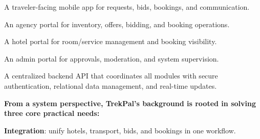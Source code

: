 \documentclass[12pt,a4paper]{article}
\newlength{\ThesisParagraphIndent}
\newcommand{\ThesisParagraph}[1]{%
  \par\begingroup
  \setlength{\leftskip}{\ThesisParagraphIndent}%
  \setlength{\parindent}{0pt}%
  \noindent#1\par
  \endgroup}
\begin{document}
\begin{list}{}{\setlength{\leftmargin}{\dimexpr\ThesisParagraphIndent+1.5em\relax}\setlength{\labelsep}{0.5em}\setlength{\topsep}{2pt}\setlength{\parsep}{0pt}}
\item[\textbullet] A traveler-facing mobile app for requests, bids, bookings, and communication.
\end{list}


\begin{list}{}{\setlength{\leftmargin}{\dimexpr\ThesisParagraphIndent+1.5em\relax}\setlength{\labelsep}{0.5em}\setlength{\topsep}{2pt}\setlength{\parsep}{0pt}}
\item[\textbullet] An agency portal for inventory, offers, bidding, and booking operations.
\end{list}


\begin{list}{}{\setlength{\leftmargin}{\dimexpr\ThesisParagraphIndent+1.5em\relax}\setlength{\labelsep}{0.5em}\setlength{\topsep}{2pt}\setlength{\parsep}{0pt}}
\item[\textbullet] A hotel portal for room/service management and booking visibility.
\end{list}


\begin{list}{}{\setlength{\leftmargin}{\dimexpr\ThesisParagraphIndent+1.5em\relax}\setlength{\labelsep}{0.5em}\setlength{\topsep}{2pt}\setlength{\parsep}{0pt}}
\item[\textbullet] An admin portal for approvals, moderation, and system supervision.
\end{list}


\begin{list}{}{\setlength{\leftmargin}{\dimexpr\ThesisParagraphIndent+1.5em\relax}\setlength{\labelsep}{0.5em}\setlength{\topsep}{2pt}\setlength{\parsep}{0pt}}
\item[\textbullet] A centralized backend API that coordinates all modules with secure authentication, relational data management, and real-time updates.
\end{list}


\ThesisParagraph{\textbf{From a system perspective, TrekPal's background is rooted in solving three core practical needs:}}


\begin{list}{}{\setlength{\leftmargin}{\dimexpr\ThesisParagraphIndent+1.5em\relax}\setlength{\labelsep}{0.5em}\setlength{\topsep}{2pt}\setlength{\parsep}{0pt}}
\item[\textbullet] \textbf{Integration}: unify hotels, transport, bids, and bookings in one workflow.
\end{list}
\end{document}
